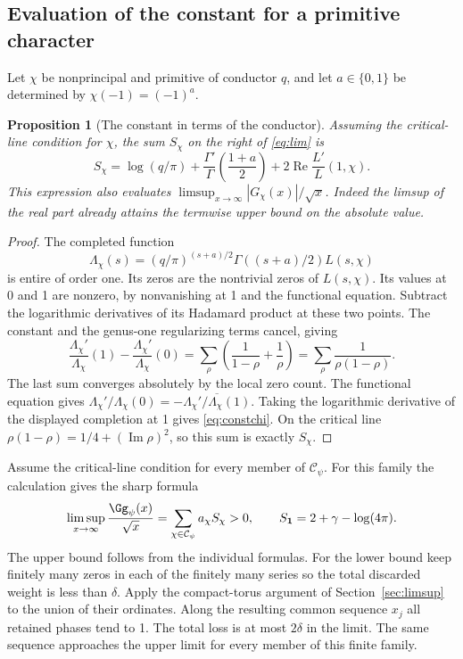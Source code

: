 \documentclass[a4paper,11pt]{article}
\newtheorem{proposition}{Proposition}[section]
\theoremstyle{definition}
\theoremstyle{remark}
\newcommand{\real}{\operatorname{Re}}\newcommand{\imag}{\operatorname{Im}}
\numberwithin{equation}{section}
\begin{document}
\subsection{Evaluation of the constant for a primitive character}\label{nav:I-10}
\label{sec:closedconstant}
Let \(\chi\) be nonprincipal and primitive of conductor \(q\), and let \(a\in\{0,1\}\) be determined by \(\chi(-1)=(-1)^a\). 
\begin{proposition}[The constant in terms of the conductor]\label{prop:const}
Assuming the critical-line condition for \(\chi\), the sum \(S_\chi\) on the right of \eqref{eq:lim} is
\begin{equation}
 S_\chi=\log(q/\pi)+\frac{\Gamma'}{\Gamma}\!\left(\frac{1+a}{2}\right)
                     +2\real\frac{L'}{L}(1,\chi).
 \label{eq:constchi}
\end{equation}
This expression also evaluates \(\limsup_{x\to\infty}|G_\chi(x)|/\sqrt{x}\). Indeed the limsup of the real part already attains the termwise upper bound on the absolute value.

\end{proposition}
\begin{proof}
The completed function
\[
 \Lambda_\chi(s)=(q/\pi)^{(s+a)/2}\Gamma((s+a)/2)L(s,\chi)
\]
is entire of order one. Its zeros are the nontrivial zeros of \(L(s,\chi)\). Its values at 0 and 1 are nonzero, by nonvanishing at 1 and the functional equation. Subtract the logarithmic derivatives of its Hadamard product at these two points. The constant and the genus-one regularizing terms cancel, giving
\[
 \frac{\Lambda_\chi'}{\Lambda_\chi}(1)-
 \frac{\Lambda_\chi'}{\Lambda_\chi}(0)
 =\sum_\rho\left(\frac1{1-\rho}+\frac1{\rho}\right)
 =\sum_\rho\frac1{\rho(1-\rho)}.
\]
The last sum converges absolutely by the local zero count. The functional equation gives
\(\Lambda_\chi'/\Lambda_\chi(0)=-\overline{\Lambda_\chi'/\Lambda_\chi(1)}\).
Taking the logarithmic derivative of the displayed completion at 1 gives \eqref{eq:constchi}. On the critical line \(\rho(1-\rho)=1/4+(\imag\rho)^2\), so this sum is exactly \(S_\chi\).
\end{proof}

Assume the critical-line condition for every member of \(\mathcal C_\psi\). For this family the calculation gives the sharp formula
\begin{equation}
       \limsup_{x\to\infty}\frac{\Gg_\psi(x)}{\sqrt{x}}
            =\sum_{\chi\in\mathcal C_\psi}a_\chi S_\chi>0,
 \qquad S_{\mathbf1}=2+\gamma-\log(4\pi).       \label{eq:weightedlim}
\end{equation}
The upper bound follows from the individual formulas. For the lower bound keep finitely many zeros in each of the finitely many series so the total discarded weight is less than \(\delta\). Apply the compact-torus argument of Section~\ref{sec:limsup} to the union of their ordinates. Along the resulting common sequence \(x_j\) all retained phases tend to 1. The total loss is at most \(2\delta\) in the limit. The same sequence approaches the upper limit for every member of this finite family.
\end{document}
